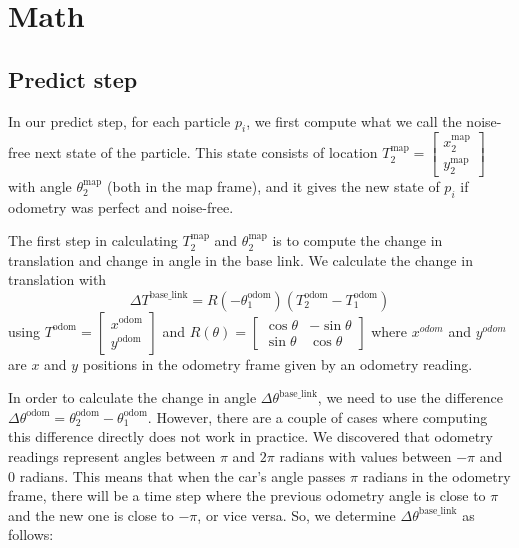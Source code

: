 \section{Math}

\subsection{Predict step}

In our predict step, for each particle $p_i$, we first compute what we call the noise-free next state of the particle. This state consists of location $T_2^\mathrm{map} = \begin{bmatrix} x_2^\mathrm{map} \\ y_2^\mathrm{map} \end{bmatrix}$ with angle $\theta_2^\mathrm{map}$ (both in the map frame), and it gives the new state of $p_i$ if odometry was perfect and noise-free.

The first step in calculating $T_2^\mathrm{map}$ and $\theta_2^\mathrm{map}$ is to compute the change in translation and change in angle in the base link. We calculate the change in translation with
$$
    \Delta T^\mathrm{base\_link} =R(-\theta_1^\mathrm{odom})(T_2^\mathrm{odom}-T_1^\mathrm{odom})
$$
using 
$
    T^\mathrm{odom} = \begin{bmatrix}
            x^\mathrm{odom} \\
            y^\mathrm{odom}
        \end{bmatrix}
$ and 
$
        R(\theta) = \begin{bmatrix}
            \cos{\theta} & -\sin{\theta} \\
            \sin{\theta} & \cos{\theta}
        \end{bmatrix}
$
where $x^{odom}$ and $y^{odom}$ are $x$ and $y$ positions in the odometry frame given by an odometry reading. 

In order to calculate the change in angle $\Delta \theta^\mathrm{base\_link}$, we need to use the difference $\Delta \theta^\mathrm{odom} = \theta_2^\mathrm{odom} - \theta_1^\mathrm{odom}$. However, there are a couple of cases where computing this difference directly does not work in practice. We discovered that odometry readings represent angles between $\pi$ and $2\pi$ radians with values between $-\pi$ and $0$ radians. This means that when the car's angle passes $\pi$ radians in the odometry frame, there will be a time step where the previous odometry angle is close to $\pi$ and the new one is close to $-\pi$, or vice versa. So, we determine $\Delta \theta^\mathrm{base\_link}$ as follows:

